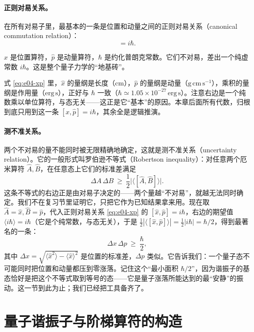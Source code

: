 \paragraph{正则对易关系。}
在所有对易子里，最基本的一条是位置和动量之间的正则对易关系（canonical commutation relation）：
\begin{equation}
  [\hat x,\hat p]=i\hbar .
  \label{eq:e04-xp}
\end{equation}
\begin{formulaexplain}
\(\hat x\) 是位置算符，\(\hat p\) 是动量算符，\(\hbar\) 是约化普朗克常数。它们不对易，差出一个纯虚常数 \(i\hbar\)。这是整个量子力学的“地基砖”。
\end{formulaexplain}
式 \eqref{eq:e04-xp} 里，\(\hat x\) 的量纲是长度（cm），\(\hat p\) 的量纲是动量（\(\mathrm{g\,cm\,s^{-1}}\)），乘积的量纲是作用量（\(\mathrm{erg\,s}\)），正好与 \(\hbar\) 一致（\(\hbar\simeq1.05\times10^{-27}\,\mathrm{erg\,s}\)）。注意右边是一个纯数乘以单位算符，与态无关——这正是它“基本”的原因。本章后面所有代数，归根到底只用到这一条 \([\hat x,\hat p]=i\hbar\)，其余全是逻辑推演。

\paragraph{测不准关系。}
两个不对易的量不能同时被无限精确地确定，这就是测不准关系（uncertainty relation）。它的一般形式叫罗伯逊不等式（Robertson inequality）：对任意两个厄米算符 \(\hat A,\hat B\)，在任意态上它们的标准差满足
\[
  \Delta A\,\Delta B\ \ge\ \frac12\big|\langle[\hat A,\hat B]\rangle\big| .
\]
这条不等式的右边正是由对易子决定的——两个量越“不对易”，就越无法同时确定。我们不在复习节里证明它，只把它作为已知结果拿来用。现在取 \(\hat A=\hat x,\hat B=\hat p\)，代入正则对易关系 \eqref{eq:e04-xp} 的 \([\hat x,\hat p]=i\hbar\)，右边的期望值 \(\langle i\hbar\rangle=i\hbar\)（它是个纯常数，与态无关），于是 \(\tfrac12|\langle[\hat x,\hat p]\rangle|=\tfrac12|i\hbar|=\hbar/2\)，得到最著名的一条：
\[
  \Delta x\,\Delta p\ \ge\ \frac{\hbar}{2},
\]
其中 \(\Delta x=\sqrt{\langle \hat x^2\rangle-\langle\hat x\rangle^2}\) 是位置的标准差，\(\Delta p\) 类似。它告诉我们：一个量子态不可能同时把位置和动量都压到零涨落。记住这个“最小面积 \(\hbar/2\)”，因为谐振子的基态恰好是把这个不等式取到等号的态——它是量子涨落所能达到的最“安静”的振动。这一节到此为止；我们已经把工具备齐了。

\section{量子谐振子与阶梯算符的构造}
\label{sec:e04-ladder}

